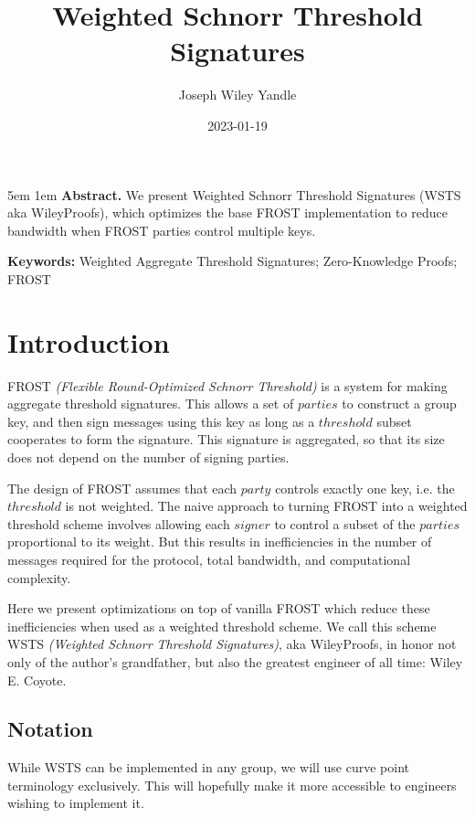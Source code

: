 \documentclass{article}
\title{Weighted Schnorr Threshold Signatures}
\date{2023-01-19}
\author{Joseph Wiley Yandle}
\begin{document}
\onecolumn
\maketitle

\begingroup
\leftskip5em
\parskip1em
\rightskip\leftskip
\noindent\textbf{Abstract.} We present Weighted Schnorr Threshold Signatures (WSTS aka WileyProofs), which optimizes the base FROST implementation to reduce bandwidth when FROST parties control multiple keys.

\par
\noindent\textbf{Keywords:} Weighted Aggregate Threshold Signatures; Zero-Knowledge Proofs; FROST
\par
\endgroup

\section{
  Introduction
}

FROST \emph{(Flexible Round-Optimized Schnorr Threshold)} \cite{frost} is a system for making aggregate threshold signatures.  This allows a set of $parties$ to construct a group key, and then sign messages using this key as long as a $threshold$ subset cooperates to form the signature.  This signature is aggregated, so that its size does not depend on the number of signing parties.

The design of FROST assumes that each $party$ controls exactly one key, i.e. the $threshold$ is not weighted.  The naive approach to turning FROST into a weighted threshold scheme involves allowing each $signer$ to control a subset of the $parties$ proportional to its weight.  But this results in inefficiencies in the number of messages required for the protocol, total bandwidth, and computational complexity.

Here we present optimizations on top of vanilla FROST which reduce these inefficiencies when used as a weighted threshold scheme.  We call this scheme WSTS \emph{(Weighted Schnorr Threshold Signatures)}, aka WileyProofs, in honor not only of the author's grandfather, but also the greatest engineer of all time: Wiley E. Coyote.

\subsection{
  Notation
}

While WSTS can be implemented in any group, we will use curve point terminology exclusively.  This will hopefully make it more accessible to engineers wishing to implement it.
\end{document}
